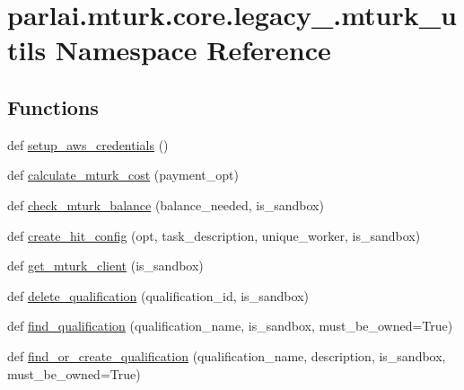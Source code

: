 \hypertarget{namespaceparlai_1_1mturk_1_1core_1_1legacy__2018_1_1mturk__utils}{}\section{parlai.\+mturk.\+core.\+legacy\+\_.\+mturk\+\_\+utils Namespace Reference}
\label{namespaceparlai_1_1mturk_1_1core_1_1legacy__2018_1_1mturk__utils}
\subsection*{Functions}
\begin{DoxyCompactItemize}
\item 
def \hyperlink{namespaceparlai_1_1mturk_1_1core_1_1legacy__2018_1_1mturk__utils_a6e138f202e17ae4a1fde82b5581e1822}{setup\+\_\+aws\+\_\+credentials} ()
\item 
def \hyperlink{namespaceparlai_1_1mturk_1_1core_1_1legacy__2018_1_1mturk__utils_a2c1cd16e531345372d5ec5c858bd74f2}{calculate\+\_\+mturk\+\_\+cost} (payment\+\_\+opt)
\item 
def \hyperlink{namespaceparlai_1_1mturk_1_1core_1_1legacy__2018_1_1mturk__utils_a49df282ab2a8eb03654fdc7817187d6a}{check\+\_\+mturk\+\_\+balance} (balance\+\_\+needed, is\+\_\+sandbox)
\item 
def \hyperlink{namespaceparlai_1_1mturk_1_1core_1_1legacy__2018_1_1mturk__utils_ae67dcf42ca4a1c4022ddac967265b474}{create\+\_\+hit\+\_\+config} (opt, task\+\_\+description, unique\+\_\+worker, is\+\_\+sandbox)
\item 
def \hyperlink{namespaceparlai_1_1mturk_1_1core_1_1legacy__2018_1_1mturk__utils_a9999d5b551e569fe3ddd368e4e659b65}{get\+\_\+mturk\+\_\+client} (is\+\_\+sandbox)
\item 
def \hyperlink{namespaceparlai_1_1mturk_1_1core_1_1legacy__2018_1_1mturk__utils_a5c70873375e623d8d95012fa4cde22d1}{delete\+\_\+qualification} (qualification\+\_\+id, is\+\_\+sandbox)
\item 
def \hyperlink{namespaceparlai_1_1mturk_1_1core_1_1legacy__2018_1_1mturk__utils_ad152f1d9ea255ea9f365695f56e0cc5f}{find\+\_\+qualification} (qualification\+\_\+name, is\+\_\+sandbox, must\+\_\+be\+\_\+owned=True)
\item 
def \hyperlink{namespaceparlai_1_1mturk_1_1core_1_1legacy__2018_1_1mturk__utils_a17d5c7b74fb3c106c48edd07059cca9d}{find\+\_\+or\+\_\+create\+\_\+qualification} (qualification\+\_\+name, description, is\+\_\+sandbox, must\+\_\+be\+\_\+owned=True)

\end{DoxyCompactItemize}
